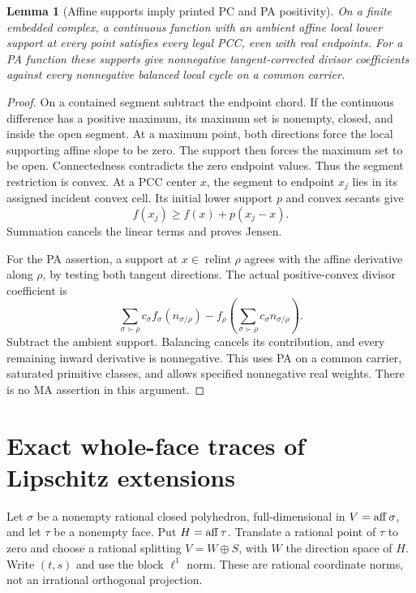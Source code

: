 \documentclass[11pt]{article}
\newtheorem{lemma}[theorem]{Lemma}
\theoremstyle{definition}\newtheorem{definition}[theorem]{Definition}
\theoremstyle{remark}\newtheorem{remark}[theorem]{Remark}
\newcommand{\ri}{\operatorname{relint}}\newcommand{\PC}{\mathrm{PC}}
\begin{document}
\begin{lemma}[Affine supports imply printed PC and PA positivity]\label{l:pc}
On a finite embedded complex, a continuous function with an ambient affine local lower support at every point satisfies every legal PCC, even with real endpoints. For a PA function these supports give nonnegative tangent-corrected divisor coefficients against every nonnegative balanced local cycle on a common carrier.
\end{lemma}
\begin{proof}
On a contained segment subtract the endpoint chord. If the continuous difference has a positive maximum, its maximum set is nonempty, closed, and inside the open segment. At a maximum point, both directions force the local supporting affine slope to be zero. The support then forces the maximum set to be open. Connectedness contradicts the zero endpoint values. Thus the segment restriction is convex. At a PCC center $x$, the segment to endpoint $x_j$ lies in its assigned incident convex cell. Its initial lower support $p$ and convex secants give
\[
 f(x_j)\geq f(x)+p(x_j-x).
\]
Summation cancels the linear terms and proves Jensen.

For the PA assertion, a support at $x\in\ri\rho$ agrees with the affine derivative along $\rho$, by testing both tangent directions. The actual positive-convex divisor coefficient is
\[
 \sum_{\sigma\succ\rho}c_\sigma f_\sigma(n_{\sigma/\rho})
 -f_\rho\left(\sum_{\sigma\succ\rho}c_\sigma n_{\sigma/\rho}\right).
\]
Subtract the ambient support. Balancing cancels its contribution, and every remaining inward derivative is nonnegative. This uses PA on a common carrier, saturated primitive classes, and allows specified nonnegative real weights. There is no MA assertion in this argument.
\end{proof}

\section{Exact whole-face traces of Lipschitz extensions}\label{s:trace}
Let $\sigma$ be a nonempty rational closed polyhedron, full-dimensional in $V=\operatorname{aff}\sigma$, and let $\tau$ be a nonempty face. Put $H=\operatorname{aff}\tau$. Translate a rational point of $\tau$ to zero and choose a rational splitting $V=W\oplus S$, with $W$ the direction space of $H$. Write $(t,s)$ and use the block $\ell^1$ norm. These are rational coordinate norms, not an irrational orthogonal projection.
\end{document}
